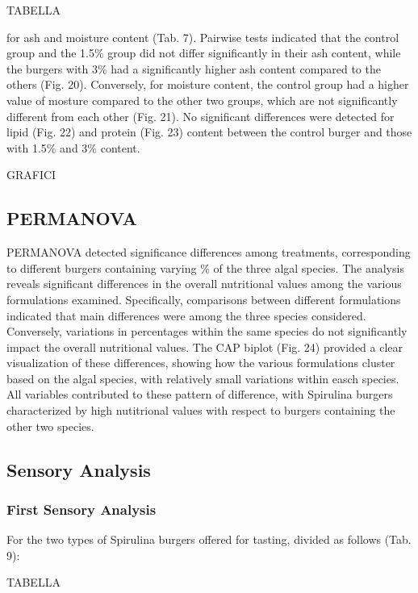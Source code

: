 TABELLA

for ash and moisture content (Tab. 7). Pairwise tests indicated that the control group and the 1.5\% group did not differ significantly in their ash content, while the burgers with 3\%  had a significantly higher ash content compared to the others (Fig. 20). Conversely, for moisture content, the control group had a higher value of mosture compared to the other two groups, which are not significantly different from each other (Fig. 21). No significant differences were detected for lipid (Fig. 22) and protein (Fig. 23) content between the control burger and those with 1.5\% and 3\% content.



GRAFICI

\subsection{PERMANOVA}
PERMANOVA detected significance differences among treatments, corresponding to different burgers containing varying \% of the three algal species. The analysis reveals significant differences in the overall nutritional values among the various formulations examined. Specifically, comparisons between different formulations indicated that main differences were among the three species considered. Conversely, variations in percentages within the same species do not significantly impact the overall nutritional values.
The CAP biplot (Fig. 24) provided a clear visualization of these differences, showing how the various formulations cluster based on the algal species, with relatively small variations within easch species. All variables contributed to these pattern of difference, with Spirulina burgers characterized by high nutitrional values with respect to burgers containing the other two species.

\subsection{Sensory Analysis}
\subsubsection{First Sensory Analysis}
For the two types of Spirulina burgers offered for tasting, divided as follows (Tab. 9):

TABELLA

